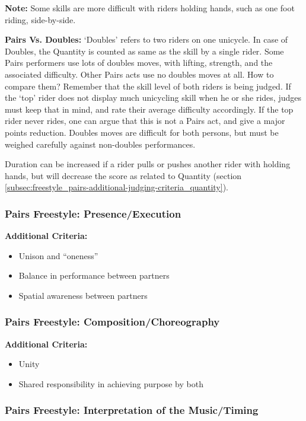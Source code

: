 \textbf{Note:} Some skills are more difficult with riders holding hands, such as one foot riding, side-by-side.

\textbf{Pairs Vs. Doubles:} `Doubles' refers to two riders on one unicycle.
In case of Doubles, the Quantity is counted as same as the skill by a single rider.
Some Pairs performers use lots of doubles moves, with lifting, strength, and the associated difficulty.
Other Pairs acts use no doubles moves at all.
How to compare them? Remember that the skill level of both riders is being judged.
If the `top' rider does not display much unicycling skill when he or she rides, judges must keep that in mind, and rate their average difficulty accordingly.
If the top rider never rides, one can argue that this is not a Pairs act, and give a major points reduction.
Doubles moves are difficult for both persons, but must be weighed carefully against non-doubles performances.

Duration can be increased if a rider pulls or pushes another rider with holding hands, but will decrease the score as related to Quantity (section \ref{subsec:freestyle_pairs-additional-judging-criteria_quantity}).

\subsubsection{Pairs Freestyle: Presence/Execution}

\textbf{Additional Criteria:}
\begin{itemize}
\item Unison and ``oneness''
\item Balance in performance between partners
\item Spatial awareness between partners
\end{itemize}

\subsubsection{Pairs Freestyle: Composition/Choreography}

\textbf{Additional Criteria:}
\begin{itemize}
\item Unity
\item Shared responsibility in achieving purpose by both
\end{itemize}

\subsubsection{Pairs Freestyle: Interpretation of the Music/Timing}

